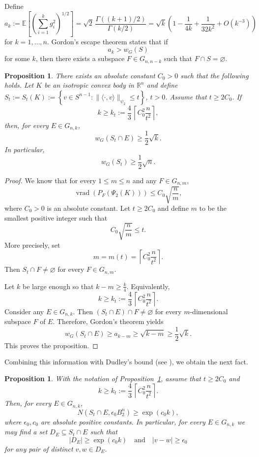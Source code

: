 \documentclass[11pt,leqno]{article}
\newtheorem{proposition}[theorem]{Proposition}
\theoremstyle{definition}
\numberwithin{equation}{section}
\newcommand{\ls}{\leqslant}
\newcommand{\gr}{\geqslant}
\begin{document}
Define
$$a_k:=\mathbb{E}\left[\left(\sum_{i=1}^k g_i^2\right)^{1/2}\right]=\sqrt{2}\,\frac{\Gamma((k+1)/2)}{\Gamma(k/2)}=\sqrt{k}\left(1-\frac{1}{4k}+\frac{1}{32k^2}
+O(k^{-3})\right)$$
for $k=1,\ldots,n$. Gordon's escape theorem states that if
$$a_k>w_G(S)$$
for some $k$, then there exists a subspace $F\in G_{n,n-k}$ such that
$F\cap S=\varnothing$.

\begin{proposition}\label{prop:gaussian-width}
There exists an absolute constant $C_0>0$ such that the following holds. Let $K$ be an isotropic convex body in $\mathbb{R}^n$ and define
$S_t:=S_t(K):=\left\{v\in S^{n-1}:\|\langle\cdot,v\rangle\|_{\psi_2}\ls  t\right\}$,\; $t>0$. Assume that $t\gr  2C_0$. If
$$k\gr  k_t:=\frac{4}{3}\,\left\lceil C_0^2\frac{n}{t^2}\right\rceil,$$
then, for every $E\in G_{n,k}$,
$$w_G(S_t\cap E)\gr  \frac{1}{2}\sqrt{k}.$$
In particular,
$$w_G(S_t)\gr  \frac{1}{2}\sqrt{n}.$$
\end{proposition}

\begin{proof}
We know that for every $1\ls  m\ls  n$ and any $F\in G_{n,m}$,
\begin{equation*}\operatorname{vrad}(P_F(\Psi_2(K)))\ls  C_0\sqrt{\frac{n}{m}},
\end{equation*}
where $C_0>0$ is an absolute constant. Let $t\gr  2C_0$ and define $m$ to be the smallest positive integer such that
$$C_0\sqrt{\frac{n}{m}} \leq t.$$
More precisely, set 
$$m=m(t)=\left\lceil C_0^2\frac{n}{t^2}\right\rceil.$$ Then $S_t\cap F\neq\varnothing$ for every $F\in G_{n,m}$. 

Let $k$ be large enough so that $k-m\gr  \frac{k}{4}$. Equivalently,
$$k\gr  k_t:=\frac{4}{3}\,\left\lceil C_0^2\frac{n}{t^2}\right\rceil.$$
Consider any $E\in G_{n,k}$. Then $(S_t\cap E)\cap F\neq\varnothing$ for every $m$-dimensional subspace $F$ of $E$. Therefore, Gordon's theorem yields
$$w_G(S_t\cap E)\gr  a_{k-m}\gr  \sqrt{k-m}\gr  \frac{1}{2}\sqrt{k}.$$
This proves the proposition.
\end{proof}

Combining this information with Dudley's bound (see
\cite[Exercise~8.6]{Vershynin-book}), we obtain the next fact.

\begin{proposition}\label{prop:distant-points}
With the notation of Proposition~\ref{prop:gaussian-width}, assume that
$t\gr  2C_0$ and
$$k\gr  k_t:=\frac{4}{3}\,\left\lceil C_0^2\frac{n}{t^2}\right\rceil.$$
Then, for every $E\in G_{n,k}$,
$$N(S_t\cap E,\epsilon_0 B_2^n)\gr  \exp(c_0k),$$
where $\epsilon_0,c_0$ are absolute positive constants. In particular, for every $E\in G_{n,k}$ we may find a set
$D_E\subseteq S_t\cap E$ such that
$$|D_E|\gr  \exp(c_0k)\quad\text{and}\quad |v-w|\gr \epsilon_0$$
for any pair of distinct $v,w\in D_E$.
\end{proposition}
\end{document}
